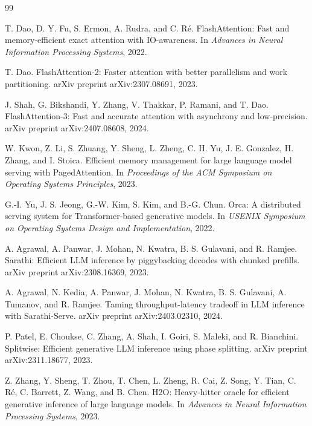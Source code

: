 \documentclass[10pt]{article}
\begin{document}
\begin{thebibliography}{99}

T. Dao, D. Y. Fu, S. Ermon, A. Rudra, and C. R{\'e}.
\newblock FlashAttention: Fast and memory-efficient exact attention with IO-awareness.
\newblock In \emph{Advances in Neural Information Processing Systems}, 2022.

T. Dao.
\newblock FlashAttention-2: Faster attention with better parallelism and work partitioning.
\newblock arXiv preprint arXiv:2307.08691, 2023.

J. Shah, G. Bikshandi, Y. Zhang, V. Thakkar, P. Ramani, and T. Dao.
\newblock FlashAttention-3: Fast and accurate attention with asynchrony and low-precision.
\newblock arXiv preprint arXiv:2407.08608, 2024.

W. Kwon, Z. Li, S. Zhuang, Y. Sheng, L. Zheng, C. H. Yu, J. E. Gonzalez,
H. Zhang, and I. Stoica.
\newblock Efficient memory management for large language model serving with PagedAttention.
\newblock In \emph{Proceedings of the ACM Symposium on Operating Systems Principles}, 2023.

G.-I. Yu, J. S. Jeong, G.-W. Kim, S. Kim, and B.-G. Chun.
\newblock Orca: A distributed serving system for Transformer-based generative models.
\newblock In \emph{USENIX Symposium on Operating Systems Design and Implementation}, 2022.

A. Agrawal, A. Panwar, J. Mohan, N. Kwatra, B. S. Gulavani, and R. Ramjee.
\newblock Sarathi: Efficient LLM inference by piggybacking decodes with chunked prefills.
\newblock arXiv preprint arXiv:2308.16369, 2023.

A. Agrawal, N. Kedia, A. Panwar, J. Mohan, N. Kwatra, B. S. Gulavani,
A. Tumanov, and R. Ramjee.
\newblock Taming throughput-latency tradeoff in LLM inference with Sarathi-Serve.
\newblock arXiv preprint arXiv:2403.02310, 2024.

P. Patel, E. Choukse, C. Zhang, A. Shah, I. Goiri, S. Maleki, and R. Bianchini.
\newblock Splitwise: Efficient generative LLM inference using phase splitting.
\newblock arXiv preprint arXiv:2311.18677, 2023.

Z. Zhang, Y. Sheng, T. Zhou, T. Chen, L. Zheng, R. Cai, Z. Song, Y. Tian,
C. R{\'e}, C. Barrett, Z. Wang, and B. Chen.
\newblock H2O: Heavy-hitter oracle for efficient generative inference of large language models.
\newblock In \emph{Advances in Neural Information Processing Systems}, 2023.


\end{thebibliography}
\end{document}
